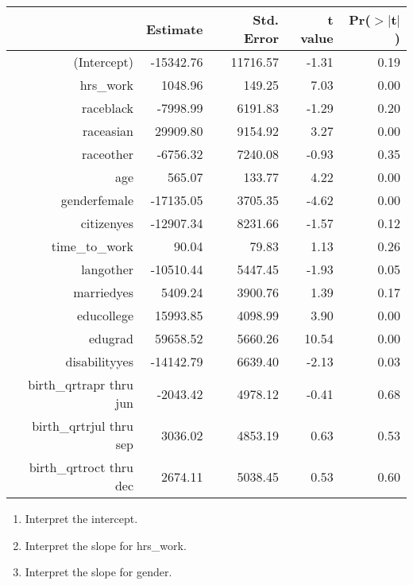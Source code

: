 \documentclass[11pt]{article}
\begin{document}
\begin{center}
{\small
\begin{tabular}{rrrrr}
  \hline
 & Estimate & Std. Error & t value & Pr($>$$|$t$|$) \\ 
  \hline
(Intercept) & -15342.76 & 11716.57 & -1.31 & 0.19 \\ 
  hrs\_work & 1048.96 & 149.25 & 7.03 & 0.00 \\ 
  raceblack & -7998.99 & 6191.83 & -1.29 & 0.20 \\ 
  raceasian & 29909.80 & 9154.92 & 3.27 & 0.00 \\ 
  raceother & -6756.32 & 7240.08 & -0.93 & 0.35 \\ 
  age & 565.07 & 133.77 & 4.22 & 0.00 \\ 
  genderfemale & -17135.05 & 3705.35 & -4.62 & 0.00 \\ 
  citizenyes & -12907.34 & 8231.66 & -1.57 & 0.12 \\ 
  time\_to\_work & 90.04 & 79.83 & 1.13 & 0.26 \\ 
  langother & -10510.44 & 5447.45 & -1.93 & 0.05 \\ 
  marriedyes & 5409.24 & 3900.76 & 1.39 & 0.17 \\ 
  educollege & 15993.85 & 4098.99 & 3.90 & 0.00 \\ 
  edugrad & 59658.52 & 5660.26 & 10.54 & 0.00 \\ 
  disabilityyes & -14142.79 & 6639.40 & -2.13 & 0.03 \\ 
  birth\_qrtrapr thru jun & -2043.42 & 4978.12 & -0.41 & 0.68 \\ 
  birth\_qrtrjul thru sep & 3036.02 & 4853.19 & 0.63 & 0.53 \\ 
  birth\_qrtroct thru dec & 2674.11 & 5038.45 & 0.53 & 0.60 \\ 
   \hline
\end{tabular}
}
\end{center}

\begin{enumerate}

\item Interpret the intercept.

\item Interpret the slope for hrs\_work.

\item Interpret the slope for gender.

\end{enumerate}
\end{document}
